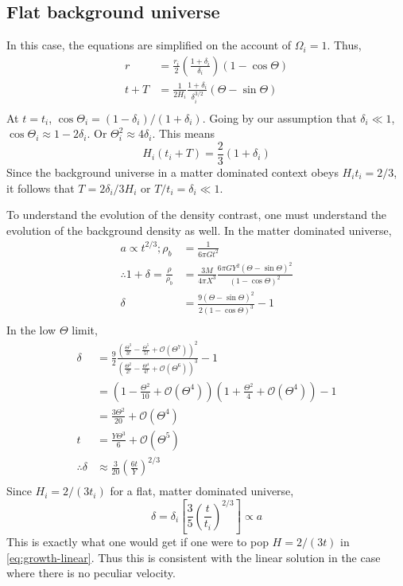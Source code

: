 \documentclass[12pt,a4paper,twoside]{book}
\begin{document}
		\subsection{Flat background universe}
			In this case, the equations are simplified on the account of $\Omega_i=1$. Thus,
			$$
			\begin{aligned}
				r&=\frac{r_i}{2}\left(\frac{1+\delta_i}{\delta_i}\right)(1-\cos\Theta)\\
				t+T&=\frac{1}{2H_i}\frac{1+\delta_i}{\delta_i^{3/2}}(\Theta-\sin\Theta)\\
			\end{aligned}
			$$
			At $t=t_i$, $\cos\Theta_i=(1-\delta_i)/(1+\delta_i)$. Going by our assumption that $\delta_i\ll 1$, $\cos\Theta_i\approx1-2\delta_i$. Or $\Theta_i^2\approx4\delta_i$. This means
			$$
				H_i(t_i+T)=\frac{2}{3}(1+\delta_i)
			$$
			Since the background universe in a  matter dominated context obeys $H_it_i=2/3$, it follows that $T=2\delta_i/3H_i$ or $T/t_i=\delta_i\ll1$.
			
			To understand the evolution of the density contrast, one must understand the evolution of the background density as well. In the matter dominated universe,
			\begin{equation}
				\begin{aligned}
					a\propto t^{2/3}; \rho_b&=\frac{1}{6\pi G t^2}\\
					\therefore 1+\delta=\frac{\rho}{\rho_b}&=\frac{3M}{4\pi X^3}\frac{6\pi GY^2(\Theta-\sin\Theta)^2}{(1-\cos\Theta)^2}\\
					\delta&=\frac{9(\Theta-\sin\Theta)^2}{2(1-\cos\Theta)^3}-1\\
				\end{aligned}
			\end{equation}
			In the low $\Theta$ limit,
			$$
				\begin{aligned}
					\delta&=\frac{9}{2}\frac{(\frac{\Theta^3}{3!}-\frac{\Theta^5}{5!}+\mathcal{O}(\Theta^7))^2}{(\frac{\Theta^2}{2!}-\frac{\Theta^4}{4!}+\mathcal{O}(\Theta^6))^3}-1\\
					&=\left(1-\frac{\Theta^2}{10}+\mathcal{O}(\Theta^4)\right)\left(1+\frac{\Theta^2}{4}+\mathcal{O}(\Theta^4)\right)-1\\
					&=\frac{3\Theta^2}{20}+\mathcal{O}(\Theta^4)\\
					t&=\frac{Y\Theta^3}{6}+\mathcal{O}(\Theta^5)\\
					\therefore \delta&\approx\frac{3}{20}\left(\frac{6t}{Y}\right)^{2/3}\\
				\end{aligned}
			$$
			Since $H_i=2/(3t_i)$ for a flat, matter dominated universe,
			$$
				\delta=\delta_i\left[\frac{3}{5}\left(\frac{t}{t_i}\right)^{2/3}\right]\propto a
			$$
			This is exactly what one would get if one were to pop $H=2/(3t)$ in \ref{eq:growth-linear}. Thus this is consistent with the linear solution in the case where there is no peculiar velocity.
			
\end{document}
